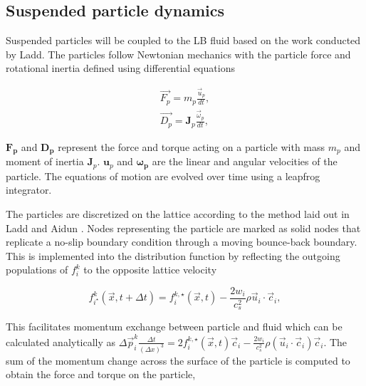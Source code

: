 
\subsection{Suspended particle dynamics}
\label{section:lbm_colloids}

Suspended particles will be coupled to the LB fluid based on the work conducted by Ladd. \cite{ladd_numerical_1994, 
aidun_direct_1998, ladd_lattice-boltzmann_2001} The particles follow Newtonian mechanics with the particle force and
rotational inertia defined using differential equations

\begin{equation}
    \begin{split}
    \vec{F_p} = m_p \frac{\vec{u}_p}{dt} , \\
    \vec{D_p} = \mathbf{J}_p \frac{\vec{\omega}_p}{dt} ,
    \label{eq:md}
    \end{split}
\end{equation}

$\mathbf{F_p}$ and $\mathbf{D_p}$ represent the force and torque acting on a particle with mass $m_p$ and moment of inertia 
$\mathbf{J}_p$. $\mathbf{u}_p$ and $\mathbf{\omega_{p}}$ are the linear and angular velocities of the particle. The equations of 
motion are evolved over time using a leapfrog integrator. \cite{jansen_bijels_2011}

The particles are discretized on the lattice according to the method laid out in Ladd and Aidun 
\cite{ladd_lattice-boltzmann_2001}. Nodes representing the particle are marked as solid nodes that replicate
a no-slip boundary condition through a moving bounce-back boundary. This is implemented into the distribution function
by reflecting the outgoing populations of $f_i^k$ to the opposite lattice velocity

\begin{equation}
    f^k_{i^\star}(\vec{x}, t+\Delta t) = f^{k,\star}_i(\vec{x}, t) - \frac{2w_i}{c_s^2} \rho \vec{u}_i \cdot \vec{c}_i ,
\end{equation}

This facilitates momentum exchange between particle and fluid which can be calculated analytically as 
\(\Delta\vec{p}^k_i \frac{\Delta t}{(\Delta x)^3} = 2 f^{k,\star}_i(\vec{x},t)\vec{c}_i - \frac{2w_i}{c_s^2}\rho(\vec{u}_i\cdot\vec{c}_i)\vec{c}_i\).
The sum of the momentum change across the surface of the particle is computed to obtain the force and torque on the particle,

